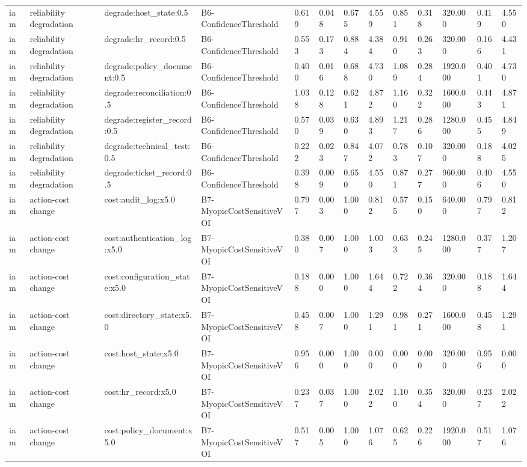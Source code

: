 \begin{table}[!ht]
{\begin{tabular}{lllllllllllll}
iam & reliability degradation & degrade:host\_state:0.5 & B6-ConfidenceThreshold & 0.619 & 0.048 & 0.675 & 4.559 & 0.851 & 0.318 & 320.000 & 0.419 & 4.550 \\
iam & reliability degradation & degrade:hr\_record:0.5 & B6-ConfidenceThreshold & 0.553 & 0.173 & 0.884 & 4.384 & 0.910 & 0.263 & 320.000 & 0.166 & 4.431 \\
iam & reliability degradation & degrade:policy\_document:0.5 & B6-ConfidenceThreshold & 0.400 & 0.016 & 0.688 & 4.730 & 1.089 & 0.284 & 1920.000 & 0.401 & 4.730 \\
iam & reliability degradation & degrade:reconciliation:0.5 & B6-ConfidenceThreshold & 1.038 & 0.128 & 0.621 & 4.872 & 1.160 & 0.322 & 1600.000 & 0.443 & 4.871 \\
iam & reliability degradation & degrade:register\_record:0.5 & B6-ConfidenceThreshold & 0.570 & 0.039 & 0.630 & 4.893 & 1.217 & 0.286 & 1280.000 & 0.455 & 4.849 \\
iam & reliability degradation & degrade:technical\_test:0.5 & B6-ConfidenceThreshold & 0.222 & 0.023 & 0.847 & 4.072 & 0.783 & 0.107 & 320.000 & 0.188 & 4.025 \\
iam & reliability degradation & degrade:ticket\_record:0.5 & B6-ConfidenceThreshold & 0.398 & 0.009 & 0.650 & 4.550 & 0.871 & 0.277 & 960.000 & 0.406 & 4.550 \\
iam & action-cost change & cost:audit\_log:x5.0 & B7-MyopicCostSensitiveVOI & 0.797 & 0.003 & 1.000 & 0.812 & 0.575 & 0.150 & 640.000 & 0.797 & 0.812 \\
iam & action-cost change & cost:authentication\_log:x5.0 & B7-MyopicCostSensitiveVOI & 0.380 & 0.007 & 1.000 & 1.003 & 0.633 & 0.245 & 1280.000 & 0.377 & 1.207 \\
iam & action-cost change & cost:configuration\_state:x5.0 & B7-MyopicCostSensitiveVOI & 0.188 & 0.000 & 1.000 & 1.644 & 0.722 & 0.364 & 320.000 & 0.188 & 1.644 \\
iam & action-cost change & cost:directory\_state:x5.0 & B7-MyopicCostSensitiveVOI & 0.458 & 0.007 & 1.000 & 1.291 & 0.981 & 0.271 & 1600.000 & 0.458 & 1.291 \\
iam & action-cost change & cost:host\_state:x5.0 & B7-MyopicCostSensitiveVOI & 0.956 & 0.000 & 1.000 & 0.000 & 0.000 & 0.000 & 320.000 & 0.956 & 0.000 \\
iam & action-cost change & cost:hr\_record:x5.0 & B7-MyopicCostSensitiveVOI & 0.237 & 0.037 & 1.000 & 2.022 & 1.100 & 0.354 & 320.000 & 0.237 & 2.022 \\
iam & action-cost change & cost:policy\_document:x5.0 & B7-MyopicCostSensitiveVOI & 0.517 & 0.005 & 1.000 & 1.076 & 0.625 & 0.226 & 1920.000 & 0.517 & 1.076 \\

\end{tabular}}
\end{table}
